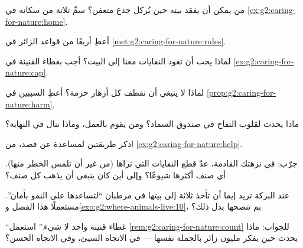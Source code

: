 \begin{exercise}[$\star$]\label{exo:g2:caring-for-nature:2}
من يمكن أن يفقد بيته حين يُركل جذع متعفن؟ سمِّ ثلاثة من سكانه في
\cref{ex:g2:caring-for-nature:home}.
\end{exercise}

\begin{exercise}[$\star$]\label{exo:g2:caring-for-nature:3}
أعطِ أربعًا من قواعد الزائر في \cref{met:g2:caring-for-nature:rules}.
\end{exercise}

\begin{exercise}[$\star$]\label{exo:g2:caring-for-nature:4}
لماذا يجب أن تعود النفايات معنا إلى البيت؟ أجب بغطاء القنينة في
\cref{ex:g2:caring-for-nature:cap}.
\end{exercise}

\begin{exercise}[$\star$]\label{exo:g2:caring-for-nature:5}
لماذا لا ينبغي أن نقطف كل أزهار حزمة؟ أعطِ السببين في
\cref{prop:g2:caring-for-nature:harm}.
\end{exercise}

\begin{exercise}[$\star$]\label{exo:g2:caring-for-nature:6}
ماذا يحدث لقلوب التفاح في صندوق السماد؟ ومن يقوم بالعمل، وماذا
ننال في النهاية؟
\end{exercise}

\begin{exercise}[$\star$]\label{exo:g2:caring-for-nature:7}
اذكر طريقتين لمساعدة  عن قصد، من
\cref{ex:g2:caring-for-nature:help}.
\end{exercise}

\begin{exercise}[$\star$]\label{exo:g2:caring-for-nature:8}
جرّب: في نزهتك القادمة، عدّ قطع النفايات التي تراها (من غير أن
تلمس الخطر منها). أي صنف أكثرها شيوعًا؟ وإلى أين كان ينبغي أن يذهب
كل صنف؟
\end{exercise}

\begin{exercise}[$\star\star$]\label{exo:g2:caring-for-nature:9}
عند البركة تريد إيما أن تأخذ ثلاثة  إلى بيتها في مرطبان
``لتساعدها على النمو بأمان''. مستعملًا هذا الفصل
و\cref{exo:g2:where-animals-live:10}، بم تنصحها بدل ذلك؟
\end{exercise}

\begin{exercise}[$\star\star$]\label{exo:g2:caring-for-nature:10}
``غطاء قنينة واحد لا شيء.'' استعمل \cref{rem:g2:caring-for-nature:count}
للجواب: ماذا يحدث حين يفكر مليون زائر بالجملة نفسها --- في
الاتجاه السيئ، وفي الاتجاه الحسن؟
\end{exercise}
